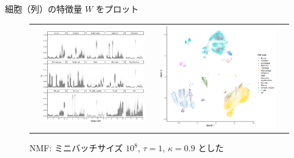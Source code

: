 \documentclass[dvipdfmx, dvipsnames]{beamer}
\begin{document}
\begin{frame}

細胞（列）の特徴量 $W$ をプロット

\begin{figure}
\begin{tabular}{ccc}
\begin{minipage}{0.45\textwidth}
\includegraphics[width=0.9\textwidth]{img/W_celltype.png}
\caption{NMF: ミニバッチサイズ $10^8$, $\tau=1$, $\kappa=0.9$ とした}
\end{minipage}
&
\begin{minipage}{0.22\textwidth}
\includegraphics[width=\textwidth]{img/UMAP_r15.png}

\end{minipage}
\end{tabular}
\end{figure}
\end{frame}
\end{document}

